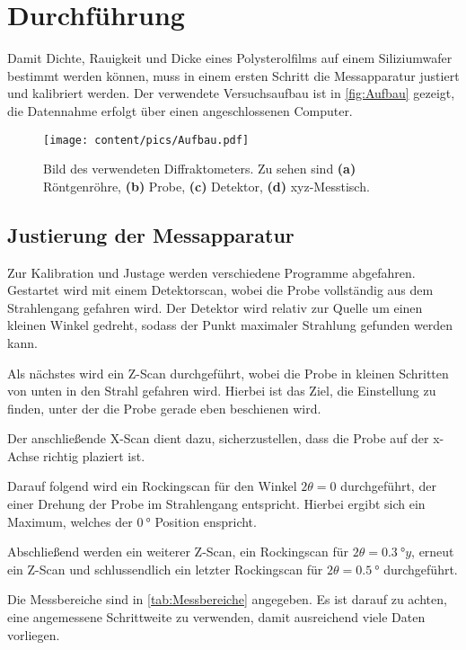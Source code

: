 \section{Durchführung}
\label{sec:Durchführung}
Damit Dichte, Rauigkeit und Dicke eines Polysterolfilms auf einem Siliziumwafer bestimmt werden können, muss in einem ersten Schritt die Messapparatur
justiert und kalibriert werden.
Der verwendete Versuchsaufbau ist in \autoref{fig:Aufbau} gezeigt, die Datennahme erfolgt über einen angeschlossenen Computer.

\begin{figure}
    \centering
    \texttt{[image: content/pics/Aufbau.pdf]}
    \caption{Bild des verwendeten Diffraktometers. Zu sehen sind \textbf{(a)} Röntgenröhre, \textbf{(b)} Probe, \textbf{(c)} Detektor, \textbf{(d)} xyz-Messtisch.}
    \label{fig:Aufbau}
\end{figure}

\subsection{Justierung der Messapparatur}
Zur Kalibration und Justage werden verschiedene Programme abgefahren. Gestartet wird mit einem Detektorscan, wobei die Probe vollständig aus dem Strahlengang
gefahren wird. Der Detektor wird relativ zur Quelle um einen kleinen Winkel gedreht, sodass der Punkt maximaler Strahlung gefunden werden kann.

Als nächstes wird ein Z-Scan durchgeführt, wobei die Probe in kleinen Schritten von unten in den Strahl gefahren wird. Hierbei ist das Ziel, die Einstellung
zu finden, unter der die Probe gerade eben beschienen wird.

Der anschließende X-Scan dient dazu, sicherzustellen, dass die Probe auf der x-Achse richtig plaziert ist.

Darauf folgend wird ein Rockingscan für den Winkel $2\theta = 0$ durchgeführt, der einer Drehung der Probe im Strahlengang entspricht. Hierbei ergibt sich ein Maximum, welches 
der $\qty{0}{\degree}$ Position enspricht.

Abschließend werden ein weiterer Z-Scan, ein Rockingscan für $2\theta = \qty{0.3}{\degree}y$, erneut ein Z-Scan und schlussendlich ein letzter Rockingscan für $2\theta = \qty{0.5}{\degree}$ durchgeführt.

Die Messbereiche sind in \autoref{tab:Messbereiche} angegeben. Es ist darauf zu achten, eine angemessene Schrittweite zu verwenden, damit ausreichend viele Daten
vorliegen.

